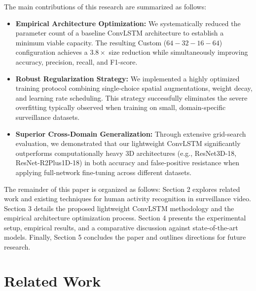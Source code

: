 \documentclass[11pt,a4paper]{article}
\begin{document}
	The main contributions of this research are summarized as follows:

	\begin{itemize}
		\item \textbf{Empirical Architecture Optimization:} We systematically 
		reduced the parameter count of a baseline ConvLSTM architecture to establish
		a minimum viable capacity. The resulting Custom ($64-32-16-64$) configuration 
		achieves a $3.8 \times$ size reduction while simultaneously improving accuracy,
		precision, recall, and F1-score.
		
		\item \textbf{Robust Regularization Strategy:} We implemented a highly optimized
		training protocol combining single-choice spatial augmentations, weight decay,
		and learning rate scheduling. This strategy successfully eliminates the severe
		overfitting typically observed when training on small, domain-specific
		surveillance datasets.
		
		\item \textbf{Superior Cross-Domain Generalization:} Through extensive grid-search
		evaluation, we demonstrated that our lightweight ConvLSTM significantly 
		outperforms computationally heavy 3D architectures (e.g., ResNet3D-18, 
		ResNet-R2Plus1D-18) in both accuracy and false-positive resistance when applying
		full-network fine-tuning across different datasets.
	\end{itemize}

	The remainder of this paper is organized as follows: Section 2 explores related work
	and existing techniques for human activity recognition in surveillance video.
	Section 3 details the proposed lightweight ConvLSTM methodology and the empirical
	architecture optimization process. Section 4 presents the experimental setup, empirical
	results, and a comparative discussion against state-of-the-art models. Finally, Section
	5 concludes the paper and outlines directions for future research.

	\section{Related Work}
\end{document}
